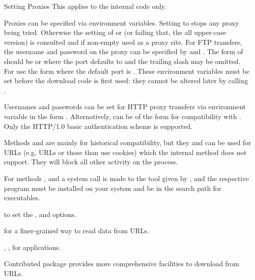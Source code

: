 %
\begin{Section}{Setting Proxies}
This applies to the internal code only.

Proxies can be specified via environment variables.
Setting  to  stops any proxy being tried.
Otherwise the setting of  or 
(or failing that, the all upper-case version) is consulted and if
non-empty used as a proxy site.  For FTP transfers, the username
and password on the proxy can be specified by 
and .  The form of 
should be  or
 where the port defaults to
 and the trailing slash may be omitted. For
 use the form 
where the default port is .  These environment variables
must be set before the download code is first used: they cannot be
altered later by calling .

Usernames and passwords can be set for HTTP proxy transfers via
environment variable  in the form
.  Alternatively,  can be of the
form  for compatibility
with .  Only the HTTP/1.0 basic authentication scheme is
supported.
\end{Section}
%
\begin{Note}\relax
Methods  and  are mainly for historical
compatibility, but they and  can be used for URLs
(e.g.  URLs or those than use cookies) which the
internal method does not support.  They will block all other activity
on the \R{} process.

For methods , and  a system
call is made to the tool given by , and the respective
program must be installed on your system and be in the search path for
executables.
\end{Note}
%
\begin{SeeAlso}\relax
{} to set the , 
and  options.

 for a finer-grained way to read data from URLs.

, ,
 for applications.

Contributed package  provides more comprehensive
facilities to download from URLs.
\end{SeeAlso}
